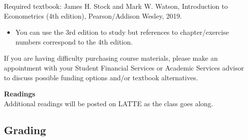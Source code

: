 \documentclass[
]{article}
\providecommand{\tightlist}{%
  \setlength{\itemsep}{0pt}\setlength{\parskip}{0pt}}
\begin{document}
Required textbook: James H. Stock and Mark W. Watson, Introduction to
Econometrics (4th edition), Pearson/Addison Wesley, 2019.

\begin{itemize}
\tightlist
\item
  You can use the 3rd edition to study but references to
  chapter/exercise numbers correspond to the 4th edition.
\end{itemize}

If you are having difficulty purchasing course materials, please make an
appointment with your Student Financial Services or Academic Services
advisor to discuss possible funding options and/or textbook
alternatives.

\textbf{Readings}\\
Additional readings will be posted on LATTE as the class goes along.

\hypertarget{grading}{%
\subsection{Grading}\label{grading}}
\end{document}
